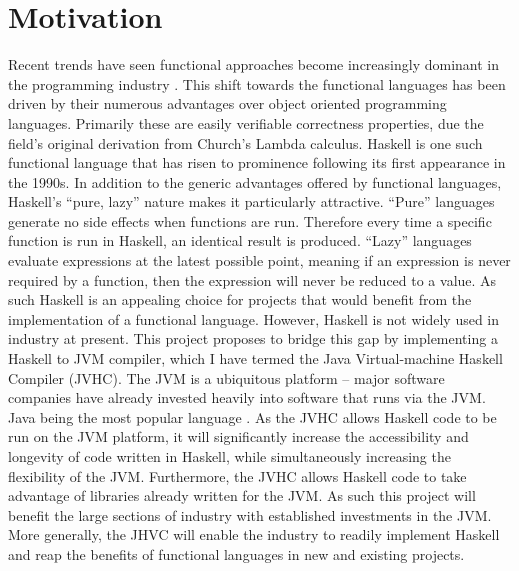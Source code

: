 \documentclass[float=false, crop=false]{standalone}
\begin{document}
\section{Motivation}

Recent trends have seen functional approaches become increasingly dominant in the programming industry 
\cite{fp-trends}. This shift towards the functional languages has been driven by their numerous advantages over object oriented programming languages.  Primarily these are easily verifiable correctness properties, due the field's original derivation from Church's Lambda calculus.  Haskell is one such functional language that has risen to prominence following its first appearance in the 1990s. In addition to the generic
advantages offered by functional languages, Haskell’s ``pure, lazy'' nature makes it particularly attractive. ``Pure'' languages generate no side effects when functions are run. Therefore every time a specific function is run in Haskell, an identical result is produced. ``Lazy'' languages evaluate expressions at the latest possible point, meaning if an expression is never required by a function, then the expression will never be reduced to a value. As such Haskell is an appealing choice for
projects that would benefit from the implementation of a functional language. However, Haskell is not widely used in industry at present. This project proposes to bridge this gap by implementing a Haskell to JVM compiler, which I have termed the Java Virtual-machine Haskell Compiler (JVHC). The JVM is a ubiquitous platform -- major software companies have already invested heavily into software that runs via the JVM.
Java being the most popular language \cite{JVM-adoption}. As the JVHC allows Haskell code to be run on the JVM platform, it will significantly increase the accessibility and longevity of code written in Haskell, while simultaneously increasing the flexibility of the JVM. Furthermore, the JVHC allows Haskell code to take advantage of libraries already written for the JVM. As such this project will benefit the large sections of industry with established investments in the JVM. More generally, the JHVC will enable the industry to readily implement Haskell and reap the benefits of functional languages in new and existing projects.


\end{document}
